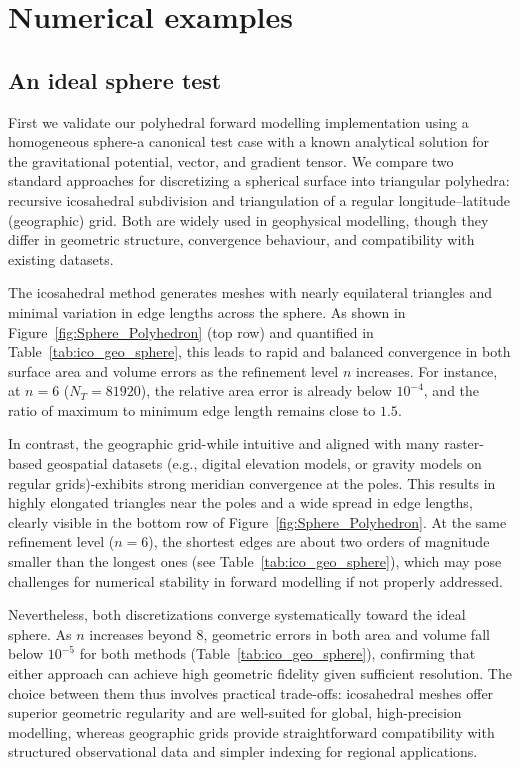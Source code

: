 \documentclass{seg}
\begin{document}
\section{Numerical examples}

\subsection{An ideal sphere test}

First we validate our polyhedral forward modelling implementation using a homogeneous sphere-a canonical test case with a known analytical solution for the gravitational potential, vector, and gradient tensor. We compare two standard approaches for discretizing a spherical surface into triangular polyhedra: recursive icosahedral subdivision \citep{Zhang2018JGeod} and triangulation of a regular longitude--latitude (geographic) grid. Both are widely used in geophysical modelling, though they differ in geometric structure, convergence behaviour, and compatibility with existing datasets.

The icosahedral method generates meshes with nearly equilateral triangles and minimal variation in edge lengths across the sphere. As shown in Figure~\ref{fig:Sphere_Polyhedron} (top row) and quantified in Table~\ref{tab:ico_geo_sphere}, this leads to rapid and balanced convergence in both surface area and volume errors as the refinement level $n$ increases. For instance, at $n=6$ ($N_T = 81920$), the relative area error is already below $10^{-4}$, and the ratio of maximum to minimum edge length remains close to $1.5$.

In contrast, the geographic grid-while intuitive and aligned with many raster-based geospatial datasets (e.g., digital elevation models, or gravity models on regular grids)-exhibits strong meridian convergence at the poles. This results in highly elongated triangles near the poles and a wide spread in edge lengths, clearly visible in the bottom row of Figure~\ref{fig:Sphere_Polyhedron}. At the same refinement level ($n=6$), the shortest edges are about two orders of magnitude smaller than the longest ones (see Table~\ref{tab:ico_geo_sphere}), which may pose challenges for numerical stability in forward modelling if not properly addressed.

Nevertheless, both discretizations converge systematically toward the ideal sphere. As $n$ increases beyond 8, geometric errors in both area and volume fall below $10^{-5}$ for both methods (Table~\ref{tab:ico_geo_sphere}), confirming that either approach can achieve high geometric fidelity given sufficient resolution. The choice between them thus involves practical trade-offs: icosahedral meshes offer superior geometric regularity and are well-suited for global, high-precision modelling, whereas geographic grids provide straightforward compatibility with structured observational data and simpler indexing for regional applications.
\end{document}

